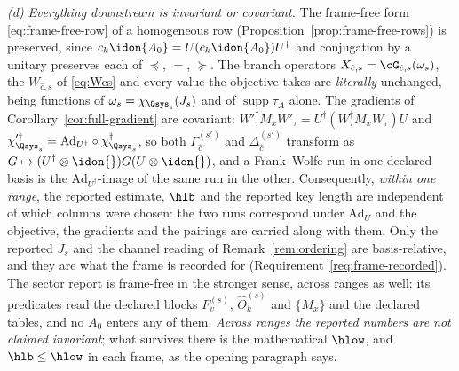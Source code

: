 \begin{remark}
\emph{(d) Everything downstream is invariant or covariant.} The
frame-free form \eqref{eq:frame-free-row} of a homogeneous row
(Proposition~\ref{prop:frame-free-rows}) is preserved, since
$c_k\idon{A_0}=U(c_k\idon{A_0})U^{\dagger}$ and conjugation by a unitary
preserves each of $\preceq$, $=$, $\succeq$. The branch operators
$X_{\hat c,s}=\cG_{\hat c,s}(\omega_s)$, the
$W_{\hat c,s}$ of \eqref{eq:Wcs} and every value the objective takes are
\emph{literally} unchanged, being functions of
$\omega_s=\chi_{\Qsys_s}(J_s)$ and of $\operatorname{supp}\tau_A$ alone.
The gradients of Corollary~\ref{cor:full-gradient} are covariant:
$W'^{\dagger}_{\tau}M_xW'_{\tau}
=U^{\dagger}(W^{\dagger}_{\tau}M_xW_{\tau})U$ and
$\chi'^{\dagger}_{\Qsys_{s}}
=\mathrm{Ad}_{U^{\dagger}}\circ\chi^{\dagger}_{\Qsys_{s}}$, so both
$\Gamma^{(s')}_{\hat c}$ and $\Delta^{(s')}_{\hat c}$ transform as
$G\mapsto(U^{\dagger}\otimes\idon{})G(U\otimes\idon{})$, and a
Frank--Wolfe run in one declared basis is the
$\mathrm{Ad}_{U^{\dagger}}$-image of the same run in the other.
Consequently, \emph{within one range}, the reported estimate, $\hlb$ and
the reported key length are independent of which columns were chosen: the
two runs correspond under $\mathrm{Ad}_{U}$ and the objective, the
gradients and the pairings are carried along with them. Only the reported
$J_s$ and the channel reading of Remark~\ref{rem:ordering} are
basis-relative, and they are what the frame is recorded for
(Requirement~\ref{req:frame-recorded}). The sector report is frame-free in
the stronger sense, across ranges as well: its predicates read the declared
blocks $F^{(s)}_v$, $\hat O^{(s)}_k$ and $\{M_x\}$ and the declared tables,
and no $A_0$ enters any of them. \emph{Across ranges the reported numbers
are not claimed invariant}; what survives there is the mathematical
$\hlow$, and $\hlb\le\hlow$ in each frame, as the opening paragraph says.
\end{remark}
